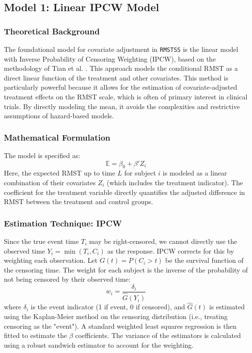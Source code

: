 \documentclass[11pt, a4paper]{article}
\begin{document}
\subsection{Model 1: Linear IPCW Model}
\subsubsection{Theoretical Background}
The foundational model for covariate adjustment in \texttt{RMSTSS} is the linear model with Inverse Probability of Censoring Weighting (IPCW), based on the methodology of Tian et al. \cite{tian2014}. This approach models the conditional RMST as a direct linear function of the treatment and other covariates. This method is particularly powerful because it allows for the estimation of covariate-adjusted treatment effects on the RMST scale, which is often of primary interest in clinical trials. By directly modeling the mean, it avoids the complexities and restrictive assumptions of hazard-based models.

\subsubsection{Mathematical Formulation}
The model is specified as:
\begin{equation}
\mathbb{E} = \beta_0 + \beta' Z_i
\end{equation}
Here, the expected RMST up to time $L$ for subject $i$ is modeled as a linear combination of their covariates $Z_i$ (which includes the treatment indicator). The coefficient for the treatment variable directly quantifies the adjusted difference in RMST between the treatment and control groups.

\subsubsection{Estimation Technique: IPCW}
Since the true event time $T_i$ may be right-censored, we cannot directly use the observed time $Y_i = \min(T_i, C_i)$ as the response. IPCW corrects for this by weighting each observation. Let $G(t) = P(C_i > t)$ be the survival function of the censoring time. The weight for each subject is the inverse of the probability of not being censored by their observed time:
\begin{equation}
w_i = \frac{\delta_i}{\hat{G}(Y_i)}
\end{equation}
where $\delta_i$ is the event indicator (1 if event, 0 if censored), and $\hat{G}(t)$ is estimated using the Kaplan-Meier method on the censoring distribution (i.e., treating censoring as the "event"). A standard weighted least squares regression is then fitted to estimate the $\beta$ coefficients. The variance of the estimators is calculated using a robust sandwich estimator to account for the weighting.
\end{document}
